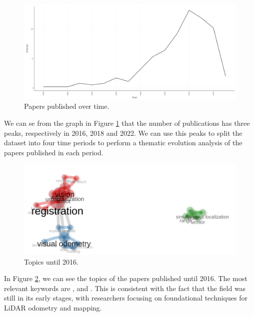 \documentclass{article}
\begin{document}
\begin{figure}[!htbp]
    \centering
    \includegraphics[width=1.0\textwidth]{img/paper_production.png}
    \caption{Papers published over time.}
    \label{fig:paper_production}
\end{figure}

We can se from the graph in Figure \ref{fig:paper_production} that the number of publications has three peaks, respectively in 2016, 2018 and 2022. We can use this peaks to split the dataset into four time periods to perform a thematic evolution analysis of the papers published in each period.

\begin{figure}[!htbp]
    \centering
    \includegraphics[width=1.0\textwidth]{img/topics_until2016.png}
    \caption{Topics until 2016.}
    \label{fig:topics_until2016}
\end{figure}

In Figure \ref{fig:topics_until2016}, we can see the topics of the papers published until 2016. The most relevant keywords are ,  and . This is consistent with the fact that the field was still in its early stages, with researchers focusing on foundational techniques for LiDAR odometry and mapping.
\end{document}
